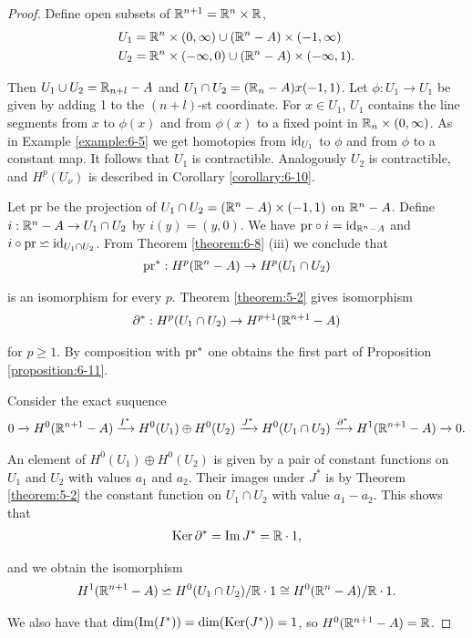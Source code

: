\begin{proof}
  Define open subsets of $\mathbb{R}^{n+1} = \mathbb{R}^n\times\mathbb{R}$,
  \begin{align*}
    U_1 & = \mathbb{R}^n \times (0, \infty)\cup (\mathbb{R}^n-A)\times(-1, \infty)\\
    U_2 & = \mathbb{R}^n \times (-\infty, 0)\cup (\mathbb{R}^n-A)\times(-\infty, 1).
  \end{align*}

  Then $U_1\cup U_2 = \mathbb{R}_{n+l} - A$ and $U_1\cap U_2 = (\mathbb{R}_n - A) x (-1,1)$. 
  Let $\phi: U_1\to U_1$ be given by adding 1 to the $(n + l)$-st coordinate. For $x\in U_1$, $U_1$ contains the
line segments from $x$ to $\phi(x)$ and from $\phi(x)$ to a fixed point in $\mathbb{R}_n\times (0, \infty)$. As
in Example \ref{example:6-5} we get homotopies from $\operatorname{id}_{U_1}$ to $\phi$ and from $\phi$ to a constant map.
It follows that $U_1$ is contractible. Analogously $U_2$ is contractible, and $H^p(U_\nu)$ is
described in Corollary \ref{corollary:6-10}.

Let pr be the projection of $U_1\cap U_2 = (\mathbb{R}^n-A)\times(-1, 1)$ on $\mathbb{R}^n - A$. Define $i:\mathbb{R}^n-A\to U_1\cap U_2$ 
by $i(y) = (y, 0)$. We have $\mathrm{pr}\circ i = \operatorname{id}_{\mathbb{R}^n-A}$ and $i\circ\mathrm{pr}\backsimeq\operatorname{id}_{U_1\cap U_2}$. From Theorem \ref{theorem:6-8}
(iii) we conclude that 
\begin{align*}
  \mathrm{pr}^*: H^p(\mathbb{R}^n - A)\to H^p(U_1\cap U_2)
\end{align*}

is an isomorphism for every $p$. Theorem \ref{theorem:5-2} gives isomorphism
\begin{align*}
  \partial^*: H^p(U_1\cap U_2)\to H^{p+1}(\mathbb{R}^{n+1} - A)
\end{align*}

for $p\ge 1$. By composition with $\mathrm{pr}^*$ one obtains the first part of Proposition \ref{proposition:6-11}.

Consider the exact suquence
\begin{align*}
  0\xrightarrow[]{}H^0(\mathbb{R}^{n+1}-A)\xrightarrow[]{I^*}H^0(U_1)\oplus H^0(U_2)\xrightarrow[]{J^*}H^0(U_1\cap U_2)\xrightarrow[]{\partial^*} 
  H^1(\mathbb{R}^{n+1}-A)\xrightarrow[]{}0.
\end{align*}

An element of $H^0(U_1)\oplus H^0(U_2)$ is given by a pair of constant functions on $U_1$ and $U_2$ with values $a_1$ and $a_2$. 
Their images under $J^*$ is by Theorem \ref{theorem:5-2} the constant function on $U_1\cap U_2$ with value $a_1 - a_2$. This shows 
that 
\begin{align*}
  \operatorname{Ker}\partial^* = \operatorname{Im} J^* = \mathbb{R}\cdot 1,
\end{align*}

and we obtain the isomorphism
\begin{align*}
  H^1(\mathbb{R}^{n+1}-A) \backsimeq H^0(U_1\cap U_2)/{\mathbb{R}\cdot 1}
  \cong H^0(\mathbb{R}^n - A)/\mathbb{R}\cdot 1.
\end{align*}

We also have that $\dim(\operatorname{Im}(I^*)) = \dim(\operatorname{Ker}(J^*)) = 1$, so $H^0(\mathbb{R}^{n+1}-A) = \mathbb{R}$. 
\end{proof}


